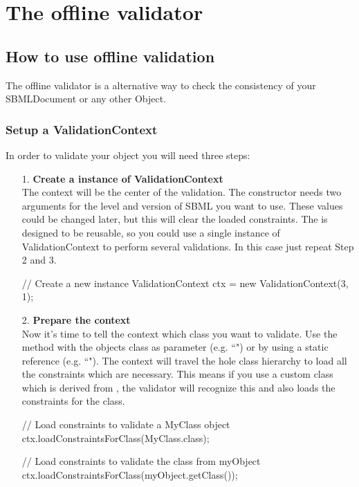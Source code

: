 \section[Offline validation]{The offline validator}
\subsection{How to use offline validation}

The offline validator is a alternative way to check the consistency of your SBMLDocument or any other Object.
\subsubsection{Setup a ValidationContext}
In order to validate your object you will need three steps:
\begin{itemize}
\item[1.] \textbf{Create a instance of ValidationContext} \\
The context will be the center of the validation. The constructor needs two arguments for the level and version of SBML you want to use. These values could be changed later, but this will clear the loaded constraints. The  is designed to be reusable, so you could use a single instance of ValidationContext to perform several validations. In this case just repeat Step 2 and 3.
\begin{example}[style=java, title={Setup a ValidationContext}]
	// Create a new instance
	ValidationContext ctx = new ValidationContext(3, 1);
\end{example}
\item[2.] \textbf{Prepare the context} \\
Now it's time to tell the context which class you want to validate. Use the method  with the objects class as parameter (e.g. ``") or by using a static reference (e.g. ``"). The context will travel the hole class hierarchy to load all the constraints which are necessary. This means if you use a custom class which is derived from \Species, the validator will recognize this and also loads the constraints for the \Species class.
\begin{example}[style=java, title={Three different ways to load constraints}]
	// Load constraints to validate a MyClass object
	ctx.loadConstraintsForClass(MyClass.class);	
	
	// Load constraints to validate the class from myObject
	ctx.loadConstraintsForClass(myObject.getClass());
	

\end{example}
\end{itemize}
